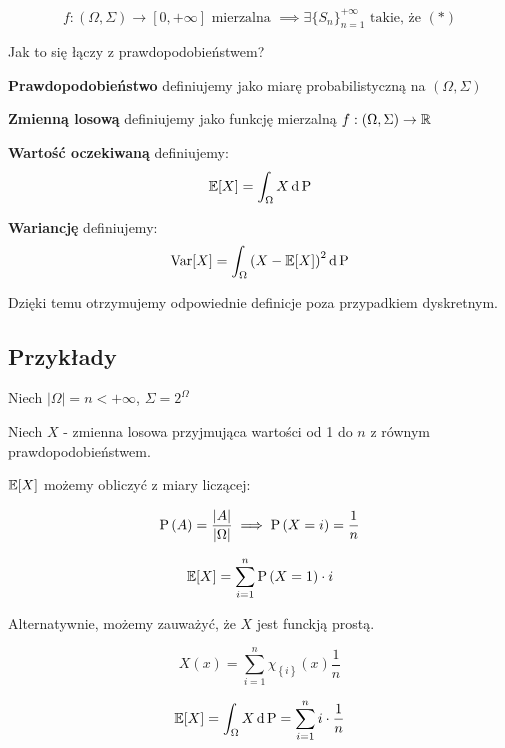 \begin{theorem}
    \[
        f : \left( \Omega, \Sigma \right) \to [0, +\infty] \text{ mierzalna } \implies \exists \{S_n\}_{n = 1}^{+\infty} \text{ takie, że } (*)
    \]
\end{theorem}

\begin{corollary}

    Jak to się łączy z prawdopodobieństwem?

    \textbf{Prawdopodobieństwo} definiujemy jako miarę probabilistyczną na \( \left( \Omega, \Sigma \right) \)

    \textbf{Zmienną losową} definiujemy jako funkcję mierzalną \( f: \left( \Omega, \Sigma \right) \to \mathbb{R} \)

    \textbf{Wartość oczekiwaną} definiujemy:
    \[
        \expected{X} = \int_{\Omega} X \diff \prob
    \]

    \textbf{Wariancję} definiujemy:
    \[
        \variance{X} = \int_{\Omega} \left( X - \expected{X} \right)^2 \diff \prob
    \]

    Dzięki temu otrzymujemy odpowiednie definicje poza przypadkiem dyskretnym.
\end{corollary}

\subsection{Przykłady}

\begin{example}

    Niech \( \left| \Omega \right| = n < +\infty \), \( \Sigma = 2^{\Omega} \)

    Niech \( X \) - zmienna losowa przyjmująca wartości od 1 do \( n \) z równym prawdopodobieństwem.

    \( \expected{X} \) możemy obliczyć z miary liczącej:

    \[ 
        \operatorname{P} \left( A \right) = \frac{ \left| A \right| }{ \left| \Omega \right| } \implies \operatorname{P} \left( X = i \right) = \frac{1}{n} 
    \]

    \[ 
        \expected{X} = \sum_{i = 1}^{n} \prob \left( X = 1 \right) \cdot i 
    \]

    Alternatywnie, możemy zauważyć, że \( X \) jest funckją prostą.

    \[ 
        X \left( x \right) = \sum_{i = 1}^{n} \chi_{\left\{ i \right\}}\left( x \right) \frac{1}{n} 
    \]

    \[ 
        \expected{X} = \int_{\Omega} X \diff \prob = \sum_{i=1}^{n} i \cdot \frac{1}{n} 
    \]

\end{example}

